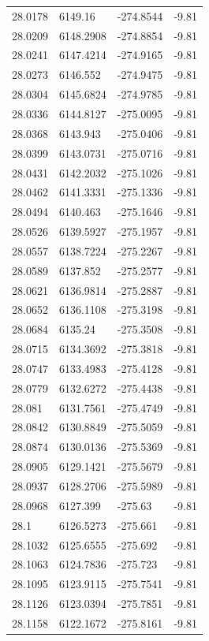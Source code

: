 \begin{table}[H]
\begin{tabular}{llll}
28.0178 & 6149.16 & -274.8544 & -9.81 \\
28.0209 & 6148.2908 & -274.8854 & -9.81 \\
28.0241 & 6147.4214 & -274.9165 & -9.81 \\
28.0273 & 6146.552 & -274.9475 & -9.81 \\
28.0304 & 6145.6824 & -274.9785 & -9.81 \\
28.0336 & 6144.8127 & -275.0095 & -9.81 \\
28.0368 & 6143.943 & -275.0406 & -9.81 \\
28.0399 & 6143.0731 & -275.0716 & -9.81 \\
28.0431 & 6142.2032 & -275.1026 & -9.81 \\
28.0462 & 6141.3331 & -275.1336 & -9.81 \\
28.0494 & 6140.463 & -275.1646 & -9.81 \\
28.0526 & 6139.5927 & -275.1957 & -9.81 \\
28.0557 & 6138.7224 & -275.2267 & -9.81 \\
28.0589 & 6137.852 & -275.2577 & -9.81 \\
28.0621 & 6136.9814 & -275.2887 & -9.81 \\
28.0652 & 6136.1108 & -275.3198 & -9.81 \\
28.0684 & 6135.24 & -275.3508 & -9.81 \\
28.0715 & 6134.3692 & -275.3818 & -9.81 \\
28.0747 & 6133.4983 & -275.4128 & -9.81 \\
28.0779 & 6132.6272 & -275.4438 & -9.81 \\
28.081 & 6131.7561 & -275.4749 & -9.81 \\
28.0842 & 6130.8849 & -275.5059 & -9.81 \\
28.0874 & 6130.0136 & -275.5369 & -9.81 \\
28.0905 & 6129.1421 & -275.5679 & -9.81 \\
28.0937 & 6128.2706 & -275.5989 & -9.81 \\
28.0968 & 6127.399 & -275.63 & -9.81 \\
28.1 & 6126.5273 & -275.661 & -9.81 \\
28.1032 & 6125.6555 & -275.692 & -9.81 \\
28.1063 & 6124.7836 & -275.723 & -9.81 \\
28.1095 & 6123.9115 & -275.7541 & -9.81 \\
28.1126 & 6123.0394 & -275.7851 & -9.81 \\
28.1158 & 6122.1672 & -275.8161 & -9.81 \\

\end{tabular}
\end{table}
